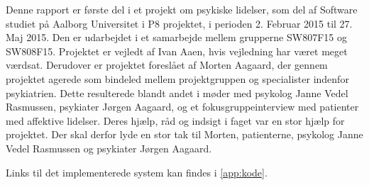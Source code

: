 Denne rapport er første del i et projekt om psykiske lidelser, som del af Software studiet på Aalborg Universitet i P8 projektet, i perioden 2. Februar 2015 til 27. Maj 2015. 
Den er udarbejdet i et samarbejde mellem grupperne SW807F15 og SW808F15.
Projektet er vejledt af Ivan Aaen, hvis vejledning har været meget værdsat.
Derudover er projektet foreslået af Morten Aagaard, der gennem projektet agerede som bindeled mellem projektgruppen og specialister indenfor psykiatrien.
Dette resulterede blandt andet i møder med psykolog Janne Vedel Rasmussen, psykiater Jørgen Aagaard, og et fokusgruppeinterview med patienter med affektive lidelser.
Deres hjælp, råd og indsigt i faget var en stor hjælp for projektet.
Der skal derfor lyde en stor tak til Morten, patienterne, psykolog Janne Vedel Rasmussen og psykiater Jørgen Aagaard.

Links til det implementerede system kan findes i \cref{app:kode}.
